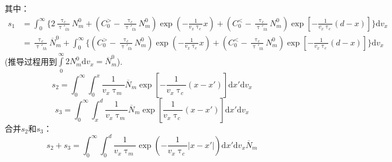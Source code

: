 \documentclass{article}
\begin{document}
	其中：
	\begin{equation}
		\begin{aligned}
			s_1&=\int_0^{\infty}\{2\frac{\uptau_c}{\uptau'_{th}}N_m^0+(C_0^>-\frac{\uptau_c}{\uptau'_{th}}N_m^0)\exp(-\frac{1}{v_x\uptau_c}x)+(C_0^<-\frac{\uptau_c}{\uptau'_{th}}N_m^0)\exp[-\frac{1}{v_x\uptau_c}(d-x)]\}\mathrm{d}v_x\\
			&=\frac{\uptau_c}{\uptau'_{th}}\overline{N}_m^0+\int_0^{\infty}\{(C_0^>-\frac{\uptau_c}{\uptau'_{th}}N_m^0)\exp(-\frac{1}{v_x\uptau_c}x)+(C_0^<-\frac{\uptau_c}{\uptau'_{th}}N_m^0)\exp[-\frac{1}{v_x\uptau_c}(d-x)]\}\mathrm{d}v_x
		\end{aligned}
	\end{equation}
	\phantom{aaaaaaaaaaaaaaaaaaaaaaaaaaaaaaaaaaaaaaaaaaaaaaaa}(推导过程用到$\int\limits_0^{\infty}2N_m^0\mathrm{d}v_x=\overline{N}_m^0$).
	\[
		s_2=\int_0^{\infty}\int_0^x\frac{1}{v_x\uptau_m}\overline{N}_m\exp[-\frac{1}{v_x\uptau_c}(x-x')]\mathrm{d}x'\mathrm{d}v_x	
	\]
	\[
		s_3=\int_0^{\infty}\int_x^d\frac{1}{v_x\uptau_m}\overline{N}_m\exp[\frac{1}{v_x\uptau_c}(x-x')]\mathrm{d}x'\mathrm{d}v_x	
	\]
	合并$s_2$和$s_3$：
	\begin{equation}
		s_2+s_3=\int_0^{\infty}\int_0^d\frac{1}{v_x\uptau_m}\exp(-\frac{1}{v_x\uptau_c}|x-x'|)\mathrm{d}x'\mathrm{d}v_x\overline{N}_m
	\end{equation}
\end{document}
